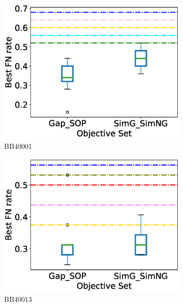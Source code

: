 \begin{figure}[!htbp]
\begin{adjustwidth}{-1cm}{-1cm}
		\begin{subfigure}{0.22\textwidth}
			\includegraphics[width=\columnwidth]{Figure/summary/precomputedInit/Balibase/BB40001_objset_fnrate_rank}
			\caption{BB40001}
		\end{subfigure}	
		\begin{subfigure}{0.22\textwidth}
			\includegraphics[width=\columnwidth]{Figure/summary/precomputedInit/Balibase/BB40013_objset_fnrate_rank}
			\caption{BB40013}
		\end{subfigure}
		\begin{subfigure}{0.22\textwidth}

\end{subfigure}
\end{adjustwidth}
\end{figure}
